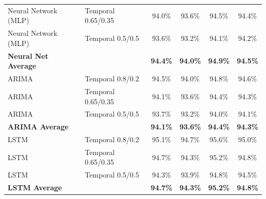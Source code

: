 \documentclass[11pt,a4paper]{article}
\begin{document}
\begin{table}[H]
\begin{tabular}{llcccc}
Neural Network (MLP) & Temporal 0.65/0.35 & 94.0\% & 93.6\% & 94.5\% & 94.4\% \\
Neural Network (MLP) & Temporal 0.5/0.5 & 93.6\% & 93.2\% & 94.1\% & 94.2\% \\
\textbf{Neural Net Average} & & \textbf{94.4\%} & \textbf{94.0\%} & \textbf{94.9\%} & \textbf{94.5\%} \\
\midrule
ARIMA & Temporal 0.8/0.2 & 94.5\% & 94.0\% & 94.8\% & 94.6\% \\
ARIMA & Temporal 0.65/0.35 & 94.1\% & 93.6\% & 94.4\% & 94.3\% \\
ARIMA & Temporal 0.5/0.5 & 93.7\% & 93.2\% & 94.0\% & 94.1\% \\
\textbf{ARIMA Average} & & \textbf{94.1\%} & \textbf{93.6\%} & \textbf{94.4\%} & \textbf{94.3\%} \\
\midrule
LSTM & Temporal 0.8/0.2 & 95.1\% & 94.7\% & 95.6\% & 95.0\% \\
LSTM & Temporal 0.65/0.35 & 94.7\% & 94.3\% & 95.2\% & 94.8\% \\
LSTM & Temporal 0.5/0.5 & 94.3\% & 93.9\% & 94.8\% & 94.5\% \\
\textbf{LSTM Average} & & \textbf{94.7\%} & \textbf{94.3\%} & \textbf{95.2\%} & \textbf{94.8\%} \\
\bottomrule
\end{tabular}
\end{table}
\end{document}
